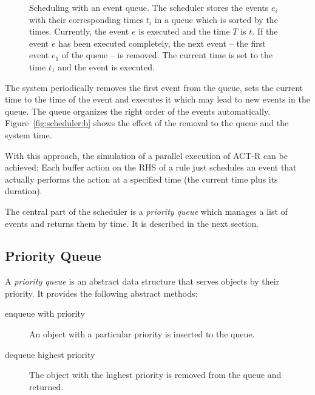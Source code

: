 \begin{figure}
{
\label{fig:scheduler:b}}
\caption{Scheduling with an event queue.  The scheduler stores the events $e_i$ with their corresponding times $t_i$ in a queue which is sorted by the times. Currently, the event $e$ is executed and the time $T$ is $t$.  If the event $e$ has been executed completely, the next event -- the first event $e_1$ of the queue -- is removed. The current time is set to the time $t_1$ and the event is executed.}
\label{fig:scheduler}
\end{figure}

The system periodically removes the first event from the queue, sets the current time to the time of the event and executes it which may lead to new events in the queue. The queue organizes the right order of the events automatically. Figure~\ref{fig:scheduler:b} shows the effect of the removal to the queue and the system time.

With this approach, the simulation of a parallel execution of ACT-R can be achieved: Each buffer action on the RHS of a rule just schedules an event that actually performs the action at a specified time (the current time plus its duration). 

The central part of the scheduler is a \emph{priority queue} which manages a list of events and returns them by time. It is described in the next section.

\subsection{Priority Queue}

A \emph{priority queue} is an abstract data structure that serves objects by their priority. It provides the following abstract methods:

\begin{description}
 \item[enqueue with priority] An object with a particular priority is inserted to the queue. 
 \item[dequeue highest priority] The object with the highest priority is removed from the queue and returned.
\end{description}

